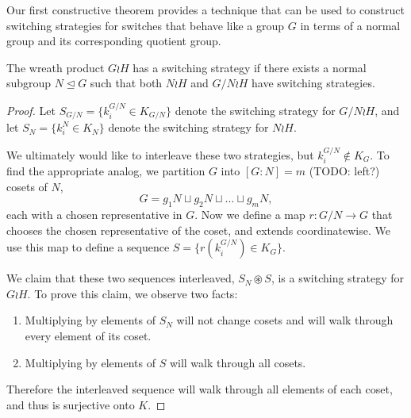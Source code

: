Our first constructive theorem provides a technique that can be used to
construct switching strategies for switches that behave like a group $G$ in
terms of a normal group and its corresponding quotient group.
\begin{theorem}
  The wreath product $G \wr H$ has a switching strategy if there exists a
  normal subgroup $N \trianglelefteq G$ such that both $N \wr H$ and
  $G/N \wr H$ have switching strategies.
\label{thm:switchingStrategyDecomposition}
\end{theorem}
\begin{proof}
  Let $S_{G/N} = \{k_i^{G/N} \in K_{G/N}\}$ denote the switching strategy for
  $G/N \wr H$, and
  let $S_{N} = \{k_i^N \in K_{N}\}$ denote the switching strategy for $N \wr H$.

  We ultimately would like to interleave these two strategies,
  but $k_i^{G/N} \not\in K_G$. To find the appropriate analog,
  we partition $G$ into $[G : N] = m$ (TODO: left?) cosets of $N$, \[
    G = g_1N \sqcup g_2N \sqcup \dots \sqcup g_mN,
  \] each with a chosen representative in $G$.
  Now we define a map $r \colon G/N \rightarrow G$ that chooses the chosen
  representative of the coset, and extends coordinatewise. We use this map to
  define a sequence $S = \{r(k_i^{G/N}) \in K_G\}$.

  We claim that these two sequences interleaved, $S_N \circledast S$, is a
  switching strategy for $G \wr H$. To prove this claim, we observe two facts:
  \begin{enumerate}
    \item Multiplying by elements of $S_N$ will not change cosets and will walk
    through every element of its coset.
    \item Multiplying by elements of $S$ will walk through all cosets.
  \end{enumerate}
  Therefore the interleaved sequence will walk through all elements of each
  coset, and thus is surjective onto $K$.
\end{proof}

